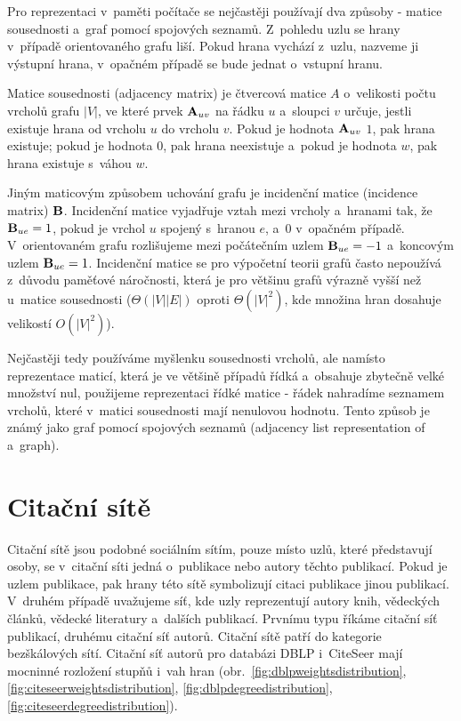 \documentclass{bakalarka}
\begin{document}
Pro reprezentaci v~paměti počítače se nejčastěji používají dva způsoby - matice
sousednosti a~graf pomocí spojových seznamů. Z~pohledu uzlu se hrany v~případě
orientovaného grafu liší. Pokud hrana vychází z~uzlu, nazveme ji výstupní
hrana, v~opačném případě se bude jednat o~vstupní hranu.


Matice sousednosti (adjacency matrix) je čtvercová matice $A$ o~velikosti počtu
vrcholů grafu $|V|$, ve které prvek ${\bf A}_{uv}$ na řádku $u$ a~sloupci $v$
určuje, jestli existuje hrana od vrcholu $u$ do vrcholu $v$. Pokud je hodnota
${\bf A}_{uv}$ $1$, pak hrana existuje; pokud je hodnota $0$, pak hrana
neexistuje a~pokud je hodnota $w$, pak hrana existuje s~váhou $w$.

Jiným maticovým způsobem uchování grafu je incidenční matice (incidence matrix)
${\bf B}$.  Incidenční matice vyjadřuje vztah mezi vrcholy a~hranami tak, že
${\bf B}_{ue} = 1$, pokud je vrchol $u$ spojený s~hranou $e$, a~$0$ v~opačném
případě. V~orientovaném grafu rozlišujeme mezi počátečním uzlem ${\bf B}_{ue} =
-1$ a~koncovým uzlem ${\bf B}_{ue} = 1$. Incidenční matice se pro výpočetní
teorii grafů často nepoužívá z~důvodu paměťové náročnosti, která je pro většinu
grafů výrazně vyšší než u~matice sousednosti ($\Theta(|V||E|)$ oproti
$\Theta(|V|^2)$, kde množina hran dosahuje velikostí $O(|V|^2)$).

Nejčastěji tedy používáme myšlenku sousednosti vrcholů, ale namísto
reprezentace maticí, která je ve většině případů řídká a~obsahuje zbytečně
velké množství nul, použijeme reprezentaci řídké matice - řádek nahradíme
seznamem vrcholů, které v~matici sousednosti mají nenulovou hodnotu. Tento
způsob je známý jako graf pomocí spojových seznamů (adjacency list
representation of a~graph).


\section{Citační sítě}
Citační sítě jsou podobné sociálním sítím, pouze místo uzlů, které představují
osoby, se v~citační síti jedná o~publikace nebo autory těchto publikací. Pokud
je uzlem publikace, pak hrany této sítě symbolizují citaci publikace jinou
publikací. V~druhém případě uvažujeme síť, kde uzly reprezentují autory knih,
vědeckých článků, vědecké literatury a~dalších publikací. Prvnímu typu říkáme
citační síť publikací, druhému citační síť autorů. Citační sítě patří do
kategorie bezškálových sítí. Citační síť autorů pro databázi DBLP i~CiteSeer
mají mocninné rozložení stupňů i~vah hran
(obr.~\ref{fig:dblpweightsdistribution}, \ref{fig:citeseerweightsdistribution},
\ref{fig:dblpdegreedistribution}, \ref{fig:citeseerdegreedistribution}).
\end{document}
